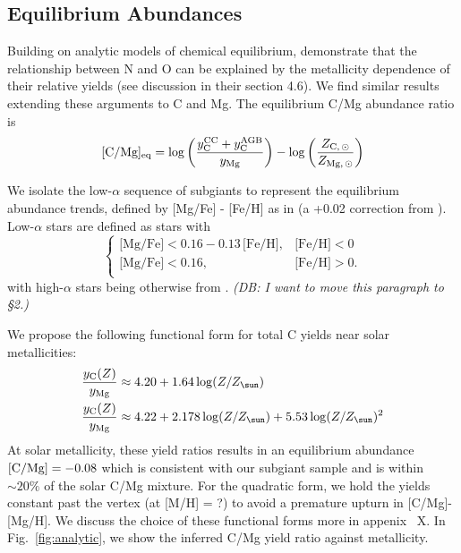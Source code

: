\documentclass[fleqn,
usenatbib]{mnras}
\makeatletter
\newcommand{\caah}{[C/Mg]-[Mg/H]}
\newcommand{\Yct}{{y_{\rm C}}}
\newcommand{\Ycc}{{y_{\rm C}^{\rm CC}}}
\newcommand{\Ycagb}{{y_{\rm C}^{\rm AGB}}}
\newcommand{\Zo}{ Z_{\sun}}
\newcommand{\about}[1]{${\sim} #1$}
\DeclareRobustCommand\citepos
  {\begingroup
   \let\NAT@nmfmt\NAT@posfmt%
   \NAT@swafalse\let\NAT@ctype\z@\NAT@partrue
   \@ifstar{\NAT@fulltrue\NAT@citetp}{\NAT@fullfalse\NAT@citetp}}
\let\NAT@orig@nmfmt\NAT@nmfmt
\def\NAT@posfmt#1{\NAT@orig@nmfmt{#1's}}
\newcommand{\dbadd}[1]{{\color{Thistle} #1}}
\newcommand{\dbnote}[1]{ {\color{Thistle} \textit{\small (DB: #1)}} }
\makeatother
\begin{document}
\subsection{Equilibrium Abundances}\label{sec:equilibrium}

Building on \citepos{WAF17} analytic models of chemical equilibrium,
\citet{james+23} demonstrate that the relationship between N and O can be
explained by the metallicity dependence of their relative yields (see discussion
in their section 4.6).
We find similar results extending these arguments to C and Mg.
The equilibrium C/Mg abundance ratio is 
\begin{equation}\label{eq:equilibrium_yields}
    {\rm [C/Mg]_{eq}} = \log \left(\frac{\Ycc + \Ycagb }{y_{\rm Mg}}\right) - \log \left(\frac{Z_{\rm C,\,\odot}}{Z_{\rm Mg,\,\odot}}\right)
\end{equation}


We isolate the low-$\alpha$ sequence of subgiants to represent the equilibrium abundance trends, defined by [Mg/Fe] - [Fe/H] as in \citet{jack} (a +0.02 correction from \citet{weinberg+19}).
Low-$\alpha$ stars are defined as stars with
\begin{equation}\label{eq:high_alpha}
\begin{cases}
\text{[Mg/Fe]} <0.16-0.13\,\text{[Fe/H]}, & \text{[Fe/H]}<0\\
\text{[Mg/Fe]} <0.16, & \text{[Fe/H]}>0. \\
\end{cases}
\end{equation}
with high-$\alpha$ stars being otherwise from \citet{weinberg+19, weinberg+22, emily+19, emily+21}. \dbnote{I want to move this paragraph to \S 2.}

We propose the following functional form for total C yields near solar metallicities:
\begin{subequations}\label{eq:yc_inferred}
    \begin{align}
        \frac{\Yct(Z)}{y_{\rm Mg}} &\approx 4.20 + 1.64 \log (Z/\Zo)\\
        \frac{\Yct(Z)}{y_{\rm Mg}} &\approx 4.22 + 2.178 \log(Z/\Zo) + 5.53 \log(Z/\Zo)^2
    \end{align}
\end{subequations}
At solar metallicity, these yield ratios results in an equilibrium abundance $[{\rm C/Mg}] = -0.08$ which is consistent with our subgiant sample and is within \about{20\%} of the solar C/Mg mixture. 
For the quadratic form, we hold the yields constant past the vertex (at {\color{red} [M/H] = ?}) to avoid a premature upturn in \caah.
We discuss the choice of these functional forms more in appenix~\dbadd{X}.
In Fig.~\ref{fig:analytic}, we show the inferred C/Mg yield ratio against metallicity. 
\end{document}
